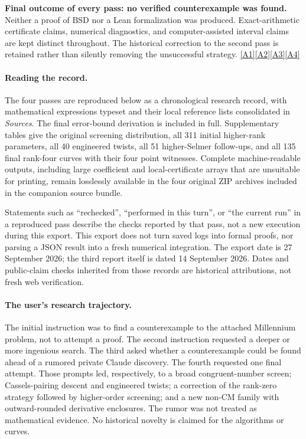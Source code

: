 \documentclass[11pt]{article}
\newcommand{\srcref}[1]{\hyperlink{source:#1}{[#1]}}
\begin{document}
\textbf{Final outcome of every pass: no verified counterexample was found.}
Neither a proof of BSD nor a Lean formalization was produced. Exact-arithmetic
certificate claims, numerical diagnostics, and computer-assisted interval
claims are kept distinct throughout. The historical correction to the second
pass is retained rather than silently removing the unsuccessful strategy.
\srcref{A1}\srcref{A2}\srcref{A3}\srcref{A4}

\paragraph{Reading the record.}
The four passes are reproduced below as a chronological research record, with
mathematical expressions typeset and their local reference lists consolidated
in \emph{Sources}. The final error-bound derivation is included in full.
Supplementary tables give the original screening distribution, all 311 initial
higher-rank parameters, all 40 engineered twists, all 51 higher-Selmer follow-ups,
and all 135 final rank-four curves with their four point witnesses. Complete
machine-readable outputs, including large coefficient and local-certificate
arrays that are unsuitable for printing, remain losslessly available in the
four original ZIP archives included in the companion source bundle.

Statements such as ``rechecked'', ``performed in this turn'', or ``the current
run'' in a reproduced pass describe the checks reported by that pass, not a
new execution during this export. This export does not turn saved logs into
formal proofs, nor parsing a JSON result into a fresh numerical integration.
The export date is 27 September 2026; the third report itself is dated
14 September 2026. Dates and public-claim checks inherited from those records
are historical attributions, not fresh web verification.

\paragraph{The user's research trajectory.}
The initial instruction was to find a counterexample to the attached Millennium
problem, not to attempt a proof. The second instruction requested a deeper or
more ingenious search. The third asked whether a counterexample could be found
ahead of a rumored private Claude discovery. The fourth requested one final
attempt. Those prompts led, respectively, to a broad congruent-number screen;
Cassels-pairing descent and engineered twists; a correction of the rank-zero
strategy followed by higher-order screening; and a new non-CM family with
outward-rounded derivative enclosures. The rumor was not treated as mathematical
evidence. No historical novelty is claimed for the algorithms or curves.
\end{document}
